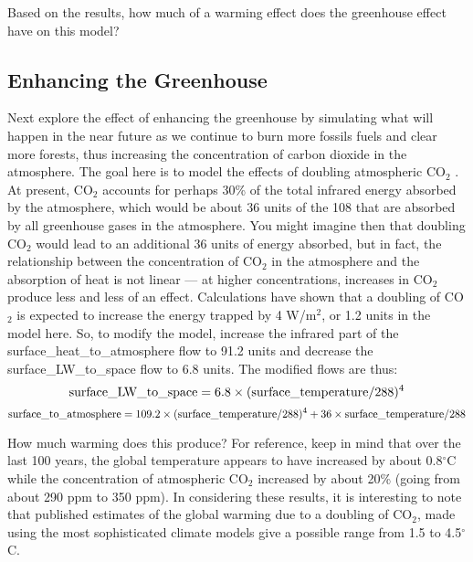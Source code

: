 \documentclass[11pt,letterpaper]{article}
\begin{document}
Based on the results, how much of a warming effect does the greenhouse effect have on this model?

\subsection{Enhancing the Greenhouse}
Next explore the effect of enhancing the greenhouse by simulating what will happen in the near future as we continue to burn more
fossils fuels and clear more forests, thus increasing the concentration of carbon dioxide in the atmosphere. The goal here is to model the
effects of doubling atmospheric CO$_2$ . At present, CO$_2$ accounts for perhaps 30\% of the total infrared energy absorbed by the
atmosphere, which would be about 36 units of the 108 that are absorbed by all greenhouse gases in the atmosphere. You might imagine
then that doubling CO$_2$ would lead to an additional 36 units of energy absorbed, but in fact, the relationship between the concentration
of CO$_2$ in the atmosphere and the absorption of heat is not linear --- at higher concentrations, increases in CO$_2$ produce less and less of an effect. Calculations have shown that a doubling of CO$_2$ is expected to increase the energy trapped by 4 W/m$^2$, or 1.2 units in the model here. So, to modify the model, increase the infrared part of the surface\_heat\_to\_atmosphere flow to 91.2 units and decrease the surface\_LW\_to\_space flow to 6.8 units. The modified flows are thus:
$$\rm surface\_LW\_to\_space = 6.8\times(surface\_temperature/288)^4$$
$$\rm surface\_to\_atmosphere=109.2\times(surface\_temperature/288)^4+36\times surface\_temperature/288$$

How much warming does this produce? For reference, keep in mind that over the last 100 years, the global temperature appears
to have increased by about 0.8$^\circ$C while the concentration of atmospheric CO$_2$ increased by about 20\% (going from about 290
ppm to 350 ppm). In considering these results, it is interesting to note that published estimates of the global warming due to a
doubling of CO$_2$, made using the most sophisticated climate models give a possible range from 1.5 to 4.5$^\circ$C.
\end{document}
